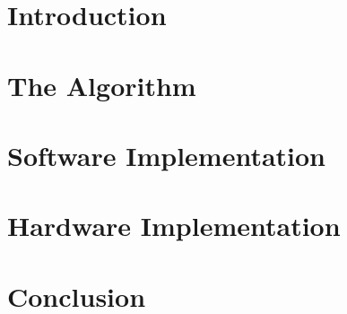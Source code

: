 \documentclass{beamer}
\begin{document}
\frame[label=titlepage,shrink]{\titlepage}

\section{Introduction}


\section{The Algorithm}


\section{Software Implementation}


\section{Hardware Implementation}


\section{Conclusion}


\appendix

\end{document}
